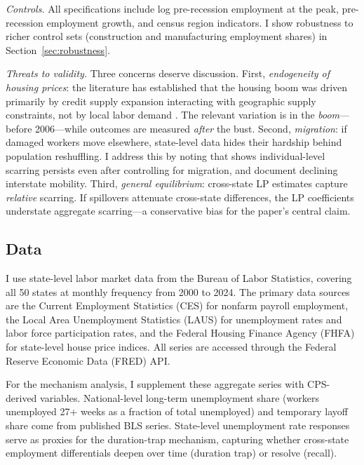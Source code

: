 \documentclass[12pt]{article}
\begin{document}
\textit{Controls.} All specifications include log pre-recession employment at the peak, pre-recession employment growth, and census region indicators. I show robustness to richer control sets (construction and manufacturing employment shares) in Section~\ref{sec:robustness}.

\textit{Threats to validity.} Three concerns deserve discussion. First, \textit{endogeneity of housing prices}: the literature has established that the housing boom was driven primarily by credit supply expansion interacting with geographic supply constraints, not by local labor demand \citep{mian2013household}. The relevant variation is in the \textit{boom}---before 2006---while outcomes are measured \textit{after} the bust. Second, \textit{migration}: if damaged workers move elsewhere, state-level data hides their hardship behind population reshuffling. I address this by noting that \citet{yagan2019employment} shows individual-level scarring persists even after controlling for migration, and \citet{dao2017regional} document declining interstate mobility. Third, \textit{general equilibrium}: cross-state LP estimates capture \textit{relative} scarring. If spillovers attenuate cross-state differences, the LP coefficients understate aggregate scarring---a conservative bias for the paper's central claim.

\subsection{Data}

I use state-level labor market data from the Bureau of Labor Statistics, covering all 50 states at monthly frequency from 2000 to 2024. The primary data sources are the Current Employment Statistics (CES) for nonfarm payroll employment, the Local Area Unemployment Statistics (LAUS) for unemployment rates and labor force participation rates, and the Federal Housing Finance Agency (FHFA) for state-level house price indices. All series are accessed through the Federal Reserve Economic Data (FRED) API.

For the mechanism analysis, I supplement these aggregate series with CPS-derived variables. National-level long-term unemployment share (workers unemployed 27+ weeks as a fraction of total unemployed) and temporary layoff share come from published BLS series. State-level unemployment rate responses serve as proxies for the duration-trap mechanism, capturing whether cross-state employment differentials deepen over time (duration trap) or resolve (recall).
\end{document}
